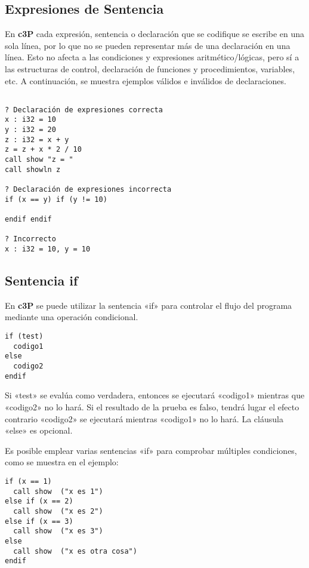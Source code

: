 \subsection{Expresiones de Sentencia}

En \textbf{c3P} cada expresión, sentencia o declaración que se codifique se escribe en una sola
línea, por lo que no se pueden representar más de una declaración en una línea. Esto
no afecta a las condiciones y expresiones aritmético/lógicas, pero sí a las estructuras
de control, declaración de funciones y procedimientos, variables, etc. A continuación,
se muestra ejemplos válidos e inválidos de declaraciones.

\begin{verbatim}

? Declaración de expresiones correcta
x : i32 = 10
y : i32 = 20
z : i32 = x + y
z = z + x * 2 / 10
call show "z = "
call showln z

? Declaración de expresiones incorrecta
if (x == y) if (y != 10)

endif endif

? Incorrecto
x : i32 = 10, y = 10
\end{verbatim}

\subsection{Sentencia if}

En \textbf{c3P} se puede utilizar la sentencia «if» para controlar el flujo del programa mediante una operación condicional.

\begin{verbatim}
if (test)
  codigo1
else
  codigo2
endif
\end{verbatim}

Si «test» se evalúa como verdadera, entonces se ejecutará «codigo1» mientras que «codigo2» no lo hará. Si el resultado de la prueba es falso, tendrá lugar el efecto contrario «codigo2» se ejecutará mientras «codigo1» no lo hará. La cláusula «else» es opcional.

Es posible emplear varias sentencias «if» para comprobar múltiples condiciones, como se muestra en el ejemplo:

\begin{verbatim}
if (x == 1)
  call show  ("x es 1")
else if (x == 2)
  call show  ("x es 2")
else if (x == 3)
  call show  ("x es 3")
else
  call show  ("x es otra cosa")
endif
\end{verbatim}

